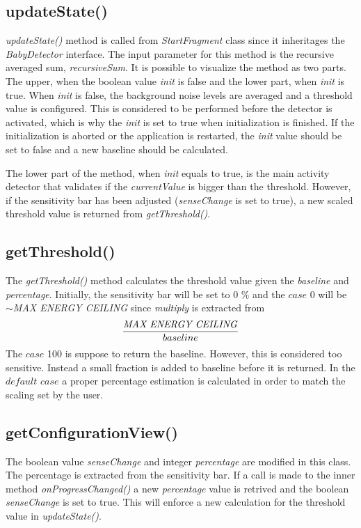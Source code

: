 \subsection{updateState()}
\emph{updateState()} method is called from \emph{StartFragment} class since it
inheritages the \emph{BabyDetector} interface. The input parameter for this
method is the recursive averaged sum, \emph{recursiveSum}. It is possible to
visualize the method as two parts. The upper, when the boolean value \emph{init}
is false and the lower part, when \emph{init} is true. When \emph{init} is
false, the background noise levels are averaged and a threshold value is
configured. This is considered to be performed before the detector is activated,
which is why the \emph{init} is set to true when initialization is finished. If
the initialization is aborted or the application is restarted, the \emph{init}
value should be set to false and a new baseline should be calculated.

The lower part of the method, when \emph{init} equals to true, is the main 
activity detector that validates if the \emph{currentValue} is bigger than the 
threshold. However, if the sensitivity bar has been adjusted (\emph{senseChange}
is set to true), a new scaled threshold value is returned from 
\emph{getThreshold()}.

\subsection{getThreshold()}
The \emph{getThreshold()} method calculates the threshold value given the
\emph{baseline} and \emph{percentage}. Initially, the sensitivity bar will be 
set to 0 \% and the $case$ 0 will be $\sim$\emph{MAX ENERGY CEILING} since 
\emph{multiply} is extracted from 
\[
\frac{\mbox{\emph{MAX ENERGY CEILING}}}{baseline}
\]
The $case$ 100 is suppose to return the baseline. However, this is considered
too sensitive. Instead a small fraction is added to baseline before it is
returned. In the $default$ $case$ a proper percentage estimation is calculated in 
order to match the scaling set by the user.


\subsection{getConfigurationView()}
The boolean value \emph{senseChange} and integer \emph{percentage} are modified
in this class. The percentage is extracted from the sensitivity bar. If a call
is made to the inner method \emph{onProgressChanged()} a new \emph{percentage} 
value is retrived and the boolean \emph{senseChange} is set to true. This will
enforce a new calculation for the threshold value in \emph{updateState()}.



